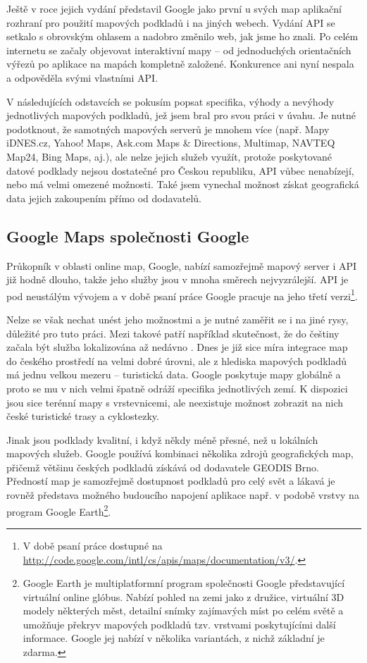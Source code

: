 Ještě v roce jejich vydání představil Google jako první u svých
map aplikační rozhraní pro použití mapových podkladů i na jiných
webech. Vydání API se setkalo s obrovským ohlasem \cite{gmapsSuccess}
a nadobro změnilo web, jak jsme ho znali. Po celém internetu se začaly objevovat
interaktivní mapy -- od jednoduchých orientačních výřezů po aplikace
na mapách kompletně založené. Konkurence ani nyní nespala a odpověděla
svými vlastními API.

V následujících odstavcích se pokusím popsat specifika, výhody a
nevýhody jednotlivých mapových podkladů, jež jsem bral pro svou práci
v úvahu. Je nutné podotknout, že samotných mapových serverů je mnohem
více (např. Mapy iDNES.cz, Yahoo! Maps, Ask.com Maps \& Directions,
Multimap, NAVTEQ Map24, Bing Maps, aj.), ale nelze jejich služeb využít,
protože poskytované datové podklady nejsou dostatečné pro Českou
republiku, API vůbec nenabízejí, nebo má velmi omezené možnosti. Také
jsem vynechal možnost získat geografická data jejich zakoupením přímo od dodavatelů.

\subsection{Google Maps společnosti Google}
Průkopník v oblasti online map, Google, nabízí samozřejmě mapový
server i API již hodně dlouho, takže jeho služby jsou v mnoha směrech
nej\-vyzrálejší. API je pod neustálým vývojem a v době psaní práce
Google pracuje na jeho třetí
verzi\footnote{V době psaní práce dostupné na
\url{http://code.google.com/intl/cs/apis/maps/documentation/v3/}.}.

Nelze se však nechat unést jeho možnostmi a je nutné zaměřit se i na
jiné rysy, důležité pro tuto práci. Mezi takové patří
například skutečnost, že do češtiny začala být služba lokalizována až
nedávno \cite{googleCesky}.
Dnes je již sice míra integrace map do českého prostředí na velmi
dobré úrovni, ale z hlediska mapových podkladů má jednu velkou mezeru
-- turistická data. Google poskytuje mapy globálně a proto se mu v
nich velmi špatně odráží specifika jednotlivých zemí. K dispozici
jsou sice terénní mapy s vrstevnicemi, ale neexistuje možnost
zobrazit na nich české turistické trasy a cyklostezky.

Jinak jsou podklady kvalitní, i když někdy méně přesné, než u
lokálních mapových služeb. Google používá kombinaci několika zdrojů
geografických map, přičemž většinu českých podkladů získává od
dodavatele GEODIS Brno. Předností map je samozřejmě dostupnost
podkladů pro celý svět a lákavá je rovněž představa možného budoucího 
napojení aplikace např. v podobě vrstvy na program Google
Earth\footnote{Google Earth je multiplatformní program společnosti
Google představující virtuální online glóbus. Nabízí pohled na zemi
jako z družice, virtuální 3D modely některých měst, detailní snímky
zajímavých míst po celém světě a umožňuje překryv mapových podkladů
tzv. vrstvami poskytujícími další informace. Google jej nabízí v
několika variantách, z nichž základní je zdarma.}.

